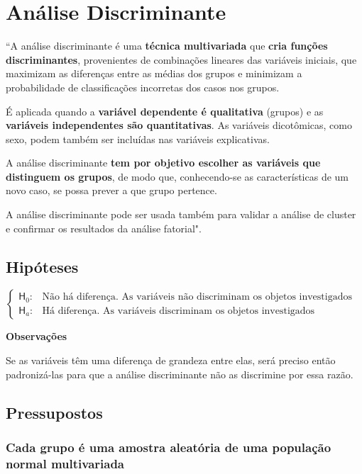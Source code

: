 \section{Análise Discriminante}

	``A análise discriminante é uma \textbf{técnica multivariada} que \textbf{cria funções discriminantes}, provenientes de combinações lineares das variáveis iniciais, que maximizam as diferenças entre as médias dos grupos e minimizam a probabilidade de classificações incorretas dos casos nos grupos.

	É aplicada quando a \textbf{variável dependente é qualitativa} (grupos) e as \textbf{variáveis independentes são quantitativas}. As variáveis dicotômicas, como sexo, podem também ser incluídas nas variáveis explicativas.

	A análise discriminante \textbf{tem por objetivo escolher as variáveis que distinguem os grupos}, de modo que, conhecendo-se as características de um novo caso, se possa prever a que grupo pertence.

	A análise discriminante pode ser usada também para validar a análise de cluster e confirmar os resultados da análise fatorial". \cite{torres}

	\subsection{Hipóteses}

		$
			\begin{cases}

				\mathsf{H}_{0} : & \text{Não há diferença. As variáveis não discriminam os objetos investigados} \\
				\mathsf{H}_{a} : & \text{Há diferença. As variáveis discriminam os objetos investigados}

			\end{cases}
		$

		\bigskip

		\textbf{Observações}

			Se as variáveis têm uma diferença de grandeza entre elas, será preciso então padronizá-las para que a análise discriminante não as discrimine por essa razão.

	\subsection{Pressupostos}

		\subsubsection{Cada grupo é uma amostra aleatória de uma população normal multivariada}

